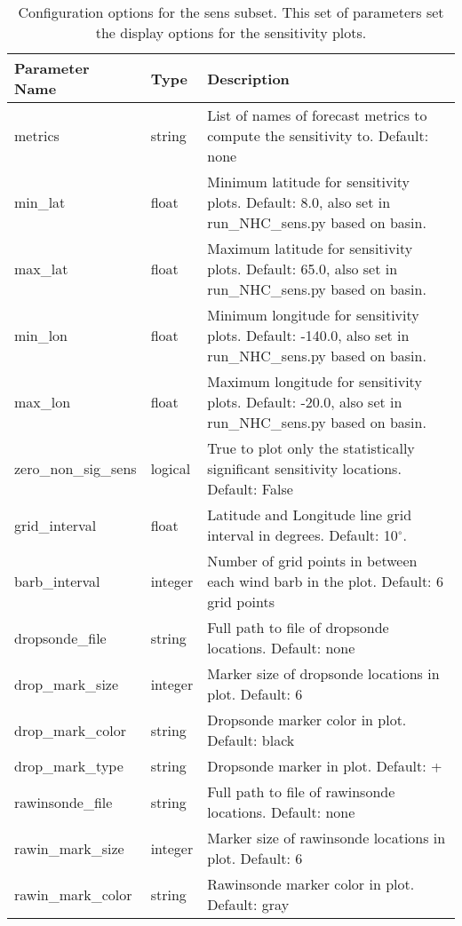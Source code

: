 \documentclass[psfig,12pt]{article}
\begin{document}
\begin{table}[H]
\caption{Configuration options for the sens subset.  This set of parameters set the display options
for the sensitivity plots.}
\begin{center}
\begin{tabular}{|p{1.25in}|p{0.5in}|p{4.5in}|}
\hline
Parameter Name & Type & Description \\  \hline \hline
metrics & string & List of names of forecast metrics to compute the sensitivity to.  
Default:  none \\ \hline
min\_lat & float & Minimum latitude for sensitivity plots.  Default:  8.0, also set in
run\_NHC\_sens.py based on basin.  \\ \hline
max\_lat & float & Maximum latitude for sensitivity plots.  Default:  65.0, also set in
run\_NHC\_sens.py based on basin.  \\ \hline
min\_lon & float & Minimum longitude for sensitivity plots.  Default:  -140.0, also set in 
run\_NHC\_sens.py based on basin.  \\ \hline
max\_lon & float & Maximum longitude for sensitivity plots.  Default:  -20.0, also set in
run\_NHC\_sens.py based on basin.  \\ \hline
zero\_non\_sig\_sens & logical & True to plot only the statistically significant 
sensitivity locations.  Default:  False   \\ \hline
grid\_interval & float & Latitude and Longitude line grid interval in degrees.
Default:  10$^{\circ}$.  \\ \hline
barb\_interval & integer & Number of grid points in between each wind barb in the plot.
Default:  6 grid points  \\ \hline
dropsonde\_file & string & Full path to file of dropsonde locations.  Default:  none \\ \hline
drop\_mark\_size & integer &  Marker size of dropsonde locations in plot.  Default:  6 \\ \hline
drop\_mark\_color & string & Dropsonde marker color in plot.  Default: black \\ \hline
drop\_mark\_type & string & Dropsonde marker in plot.  Default: + \\ \hline
rawinsonde\_file & string & Full path to file of rawinsonde locations.  Default:  none \\ \hline
rawin\_mark\_size & integer & Marker size of rawinsonde locations in plot.  Default:  6 \\ \hline
rawin\_mark\_color & string & Rawinsonde marker color in plot.  Default: gray \\ \hline

\end{tabular}
\end{center}
\end{table}
\end{document}
